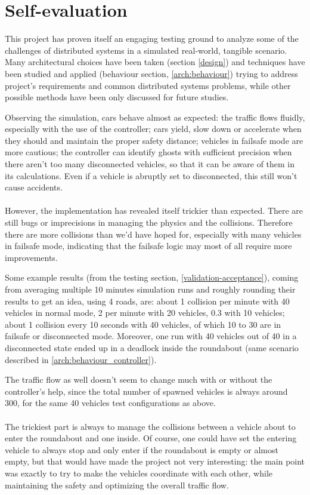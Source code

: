 \section{Self-evaluation}\label{self-evaluation}

This project has proven itself an engaging testing ground to analyze some of the
challenges of distributed systems in a simulated real-world, tangible scenario.
Many architectural choices have been taken (section \ref{design}) and techniques
have been studied and applied (behaviour section, \ref{arch:behaviour}) trying
to address project's requirements and common distributed systems problems, while
other possible methods have been only discussed for future studies.

Observing the simulation, cars behave almost as expected: the traffic flows
fluidly, especially with the use of the controller; cars yield, slow down or
accelerate when they should and maintain the proper safety distance; vehicles in
failsafe mode are more cautious; the controller can identify ghosts with
sufficient precision when there aren't too many disconnected vehicles, so that
it can be aware of them in its calculations. Even if a vehicle is abruptly set
to disconnected, this still won't cause accidents.
\\
\\
However, the implementation has revealed itself trickier than expected. There
are still bugs or imprecisions in managing the physics and the collisions.
Therefore there are more collisions than we'd have hoped for, especially with
many vehicles in failsafe mode, indicating that the failsafe logic may most of
all require more improvements.

Some example results (from the testing section, \ref{validation-acceptance}),
coming from averaging multiple 10 minutes simulation runs and roughly rounding
their results to get an idea, using 4 roads, are: about 1 collision per minute
with 40 vehicles in normal mode, 2 per minute with 20 vehicles, 0.3 with 10
vehicles; about 1 collision every 10 seconds with 40 vehicles, of which 10 to 30
are in failsafe or disconnected mode. Moreover, one run with 40 vehicles out of
40 in a disconnected state ended up in a deadlock inside the roundabout (same
scenario described in \ref{arch:behaviour_controller}).

The traffic flow as well doesn't seem to change much with or without the
controller's help, since the total number of spawned vehicles is always around
300, for the same 40 vehicles test configurations as above.
\\
\\
The trickiest part is always to manage the collisions between a vehicle about to
enter the roundabout and one inside. Of course, one could have set the entering
vehicle to always stop and only enter if the roundabout is empty or almost
empty, but that would have made the project not very interesting: the main point
was exactly to try to make the vehicles coordinate with each other, while
maintaining the safety and optimizing the overall traffic flow.

